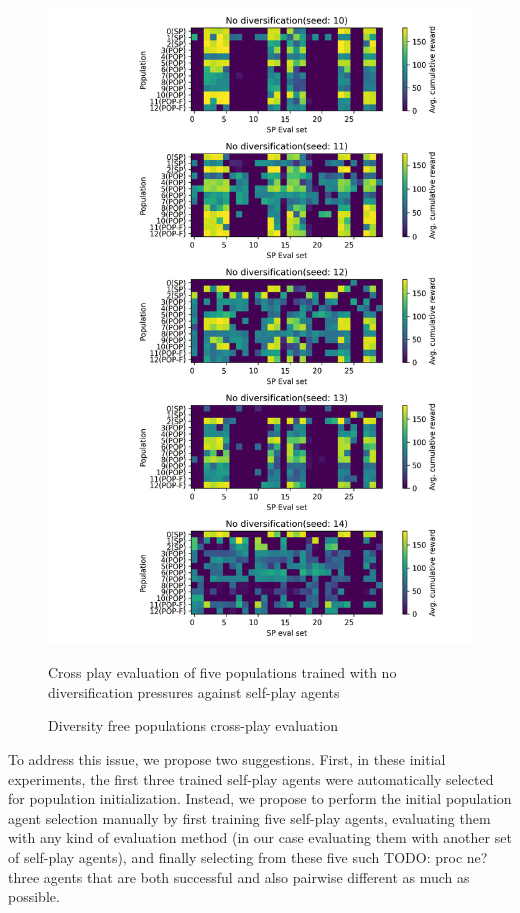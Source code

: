 \begin{figure}[!ht]
    \centering
    \includegraphics*[width=14cm]{../img/Forced_coordination_CNN_POP_NO_DIF(2).png}

    \caption{Diversity free populations cross-play evaluation}
    \label{CNNPopNoDiffBestInitFixation}
    \medskip
    \small 
    Cross play evaluation of five populations trained with no diversification pressures against self-play agents

\end{figure}

To address this issue, we propose two suggestions.
First, in these initial experiments, the first three trained self-play agents were automatically selected for population initialization.
Instead, we propose to perform the initial population agent selection manually by first training five self-play agents, evaluating them with any kind of evaluation method (in our case evaluating them with another set of self-play agents), and finally selecting from these five such {\color{blue} TODO: proc ne?} three agents that are both successful and also pairwise different as much as possible.

